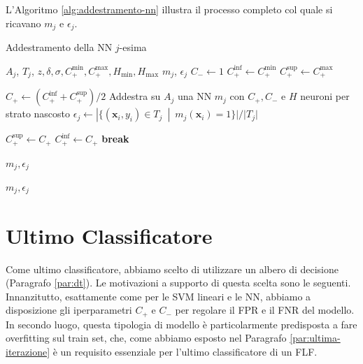L'Algoritmo \ref{alg:addestramento-nn} illustra il processo completo col quale si ricavano $m_j$ e $\epsilon_j$.

\begin{algorithm}[ht]
    \caption{Addestramento della NN $j$-esima}
    \begin{algorithmic}[1]
        \Require $A_j$, $T_j$, $z, \delta, \sigma, C_+^{\text{min}}, C_+^{\text{max}}, H_{\text{min}}, H_{\text{max}}$
        \Ensure $m_j$, $\epsilon_j$
        \State $C_- \gets 1$
            \State $C_+^{\text{inf}} \gets C_+^{\text{min}}$
            \State $C_+^{\text{sup}} \gets C_+^{\text{max}}$

                \State $C_+ \gets (C_+^{\text{inf}}+C_+^{\text{sup}})/2$
                \State Addestra su $A_j$ una NN $m_j$ con $C_+, C_-$ e $H$ neuroni per strato nascosto
                \State $\epsilon_j \gets |\{(\mathbf{x}_i, y_i) \in T_j \enspace | \enspace m_j(\mathbf{x}_i) = 1 \}|/|T_j|$
    
                    \State $C_+^{\text{sup}} \gets C_+$
                    \State $C_+^{\text{inf}} \gets C_+$
                \Else
                    \State \textbf{break}
                \EndIf
            \EndWhile

                \State \Return $m_j, \epsilon_j$
            \EndIf
            
        \EndFor
        
        \State \Return $m_j, \epsilon_j$ 
    \end{algorithmic}
    \label{alg:addestramento-nn}
\end{algorithm}







\section{Ultimo Classificatore}
\label{par:ultimo-classificatore}
Come ultimo classificatore, abbiamo scelto di utilizzare un albero di decisione (Paragrafo \ref{par:dt}). Le motivazioni a supporto di questa scelta sono le seguenti.
Innanzitutto, esattamente come per le SVM lineari e le NN, abbiamo a disposizione gli iperparametri $C_+$ e $C_-$ per regolare il FPR e il FNR del modello. In secondo luogo, questa tipologia di modello è particolarmente predisposta a fare overfitting sul train set, che, come abbiamo esposto nel Paragrafo \ref{par:ultima-iterazione} è un requisito essenziale per l'ultimo classificatore di un FLF.

